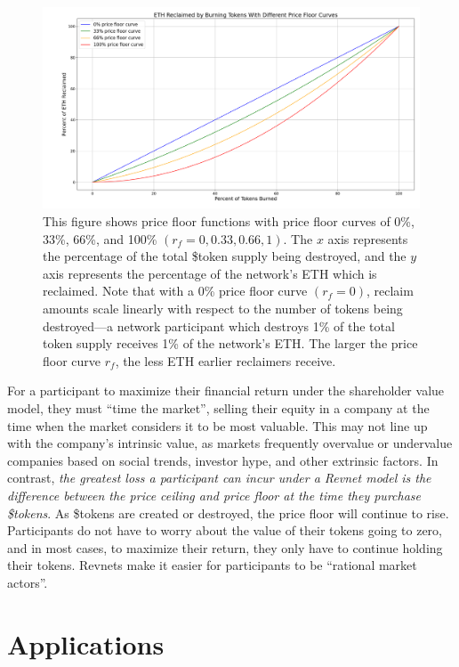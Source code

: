 \documentclass{article}
\begin{document}
\begin{figure}[ht]
  \centering
  \includegraphics[width=\textwidth]{figures/multi-floor-curves.png}
  \caption{This figure shows price floor functions with price floor curves of 0\%, 33\%, 66\%, and 100\% $(r_f = 0, 0.33, 0.66, 1)$. The $x$ axis represents the percentage of the total \$token supply being destroyed, and the $y$ axis represents the percentage of the network's ETH which is reclaimed. Note that with a 0\% price floor curve $(r_f = 0)$, reclaim amounts scale linearly with respect to the number of tokens being destroyed---a network participant which destroys 1\% of the total token supply receives 1\% of the network's ETH. The larger the price floor curve $r_f$, the less ETH earlier reclaimers receive.}
\end{figure}

For a participant to maximize their financial return under the shareholder value model, they must ``time the market'', selling their equity in a company at the time when the market considers it to be most valuable. This may not line up with the company's intrinsic value, as markets frequently overvalue or undervalue companies based on social trends, investor hype, and other extrinsic factors. In contrast, \textit{the greatest loss a participant can incur under a Revnet model is the difference between the price ceiling and price floor at the time they purchase \$tokens}. As \$tokens are created or destroyed, the price floor will continue to rise. Participants do not have to worry about the value of their tokens going to zero, and in most cases, to maximize their return, they only have to continue holding their tokens. Revnets make it easier for participants to be ``rational market actors''.

\section{Applications}
\end{document}

